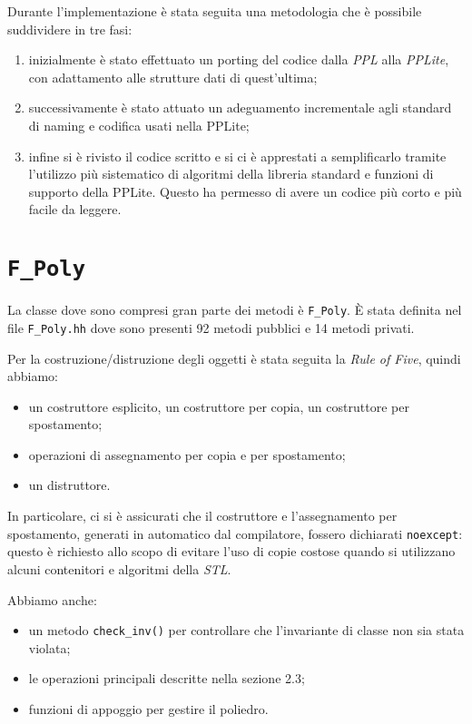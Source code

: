 \documentclass{mimosis}
\theoremstyle{definition}
\begin{document}
Durante l'implementazione è stata seguita una metodologia che è possibile suddividere in tre fasi:

\begin{enumerate}
\item inizialmente è stato effettuato un porting del codice dalla \emph{PPL} alla
\emph{PPLite}, con adattamento alle strutture dati di quest'ultima;
\item successivamente è stato attuato un adeguamento incrementale agli standard di
naming e codifica usati nella PPLite;
\item infine si è rivisto il codice scritto e si ci è apprestati a semplificarlo
tramite l'utilizzo più sistematico di algoritmi della libreria standard e
funzioni di supporto della PPLite. Questo ha permesso di avere un codice più
corto e più facile da leggere.
\end{enumerate}

\section{\texttt{F\_Poly}}
\label{sec:org8aa127a}
La classe dove sono compresi gran parte dei metodi è \texttt{F\_Poly}. È stata
definita nel file \texttt{F\_Poly.hh} dove sono presenti 92 metodi pubblici e 14 metodi
privati.

Per la costruzione/distruzione degli oggetti è stata seguita la
\emph{Rule of Five}, quindi abbiamo:

\begin{itemize}
\item un costruttore esplicito, un costruttore per copia, un costruttore per spostamento;
\item operazioni di assegnamento per copia e per spostamento;
\item un distruttore.
\end{itemize}

In particolare, ci si è assicurati che il costruttore e l'assegnamento per
spostamento, generati in automatico dal compilatore, fossero dichiarati \texttt{noexcept}: questo è richiesto allo scopo di
evitare l'uso di copie costose quando si utilizzano alcuni contenitori e
algoritmi della \emph{STL}.

Abbiamo anche:

\begin{itemize}
\item un metodo \texttt{check\_inv()} per controllare che l'invariante di classe non sia
stata violata;
\item le operazioni principali descritte nella sezione 2.3;
\item funzioni di appoggio per gestire il poliedro.
\end{itemize}
\end{document}
